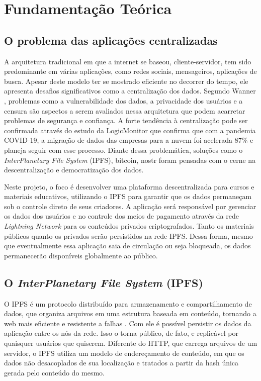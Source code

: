 \chapter[Fundamentação Teórica]{Fundamentação Teórica}

\section{O problema das aplicações centralizadas}

A arquitetura tradicional em que a internet se baseou, cliente-servidor, tem sido predominante em várias aplicações, como redes sociais, mensageiros, aplicações de busca. Apesar deste modelo ter se mostrado eficiente no decorrer do tempo, ele apresenta desafios significativos como a centralização dos dados. Segundo Wanner \cite{wanner2024}, problemas como a vulnerabilidade dos dados, a privacidade dos usuários e a censura são aspectos a serem avaliados nessa arquitetura que podem acarretar problemas de segurança e confiança. A forte tendência à centralização pode ser confirmada através do estudo da LogicMonitor \cite{logicmonitor2023} que confirma que com a pandemia COVID-19, a migração de dados das empresas para a nuvem foi acelerada 87\% e planeja seguir com esse processo. Diante dessa problemática, soluções como o \textit{InterPlanetary File System} (IPFS), bitcoin, nostr foram pensadas com o cerne na descentralização e democratização dos dados.

Neste projeto, o foco é desenvolver uma plataforma descentralizada para cursos e materiais educativos, utilizando o IPFS para garantir que os dados permaneçam sob o controle direto de seus criadores. A aplicação será responsável por gerenciar os dados dos usuários e no controle dos meios de pagamento através da rede  \textit{Lightning Network} \cite{lightningnetwork} para os conteúdos privados criptografados. Tanto os materiais públicos quanto os privados serão persistidos na rede IPFS. Dessa forma, mesmo que eventualmente essa aplicação saia de circulação ou seja bloqueada, os dados permanecerão disponíveis globalmente ao público.


\section{O \textit{InterPlanetary File System} (IPFS)}
O IPFS é um protocolo distribuído para armazenamento e compartilhamento de dados, que organiza arquivos em uma estrutura baseada em conteúdo, tornando a web mais eficiente e resistente a falhas \cite{ipfs2025}. Com ele é possível persistir os dados da aplicação entre os nós da rede. Isso o torna público, de fato, e replicável por quaisquer usuários que quiserem. Diferente do HTTP, que carrega arquivos de um servidor, o IPFS utiliza um modelo de endereçamento de conteúdo, em que os dados não desacoplados de sua localização e tratados a partir da hash única gerada pelo conteúdo do mesmo.

